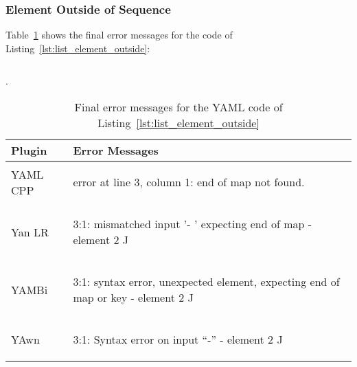 \subsubsection{Element Outside of Sequence}

Table~\ref{tab:error_messages_final_list_element_outside} shows the final error messages for the code of Listing~\ref{lst:list_element_outside}:

\begin{code-boxed}
  \inputminted[linenos]{yaml}{Data/Errors/list_element_outside.yaml}
\end{code-boxed}

.

\begin{table}[H]
  \caption{Final error messages for the YAML code of Listing~\ref{lst:list_element_outside}}
  \label{tab:error_messages_final_list_element_outside}

  \centering
  \begin{tabular}{lp{}}
    \toprule
    Plugin & Error Messages\\
    \midrule

    \vspace{0cm}
    YAML CPP &
    \vspace{-0.36cm}
    \begin{textcode}
      error at line 3, column 1: end of map not found.
    \end{textcode}
    \\

    \vspace{0cm}
    Yan LR &
    \vspace{-0.36cm}
    \begin{textcode}
      3:1: mismatched input '- ' expecting end of map
           - element 2
           ^^
    \end{textcode}
    \\

    \vspace{0cm}
    YAMBi &
    \vspace{-0.36cm}
    \begin{textcode}
      3:1: syntax error, unexpected element,
           expecting end of map or key
           - element 2
           ^^
    \end{textcode}
    \\

    \vspace{0cm}
    YAwn &
    \vspace{-0.36cm}
    \begin{textcode}
      3:1: Syntax error on input “-”
           - element 2
           ^^
    \end{textcode}
    \\


\end{tabular}
\end{table}
